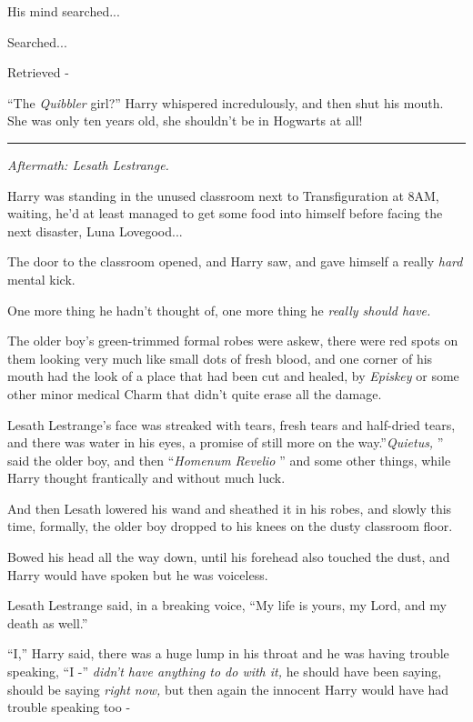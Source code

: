 His mind searched...

Searched...

Retrieved -

``The \emph{Quibbler} girl?'' Harry whispered incredulously, and then
shut his mouth. She was only ten years old, she shouldn't be in Hogwarts
at all!

\begin{center}\rule{3in}{0.4pt}\end{center}

\emph{Aftermath: Lesath Lestrange.}

Harry was standing in the unused classroom next to Transfiguration at
8AM, waiting, he'd at least managed to get some food into himself before
facing the next disaster, Luna Lovegood...

The door to the classroom opened, and Harry saw, and gave himself a
really \emph{hard} mental kick.

One more thing he hadn't thought of, one more thing he \emph{really
should have.}

The older boy's green-trimmed formal robes were askew, there were red
spots on them looking very much like small dots of fresh blood, and one
corner of his mouth had the look of a place that had been cut and
healed, by \emph{Episkey} or some other minor medical Charm that didn't
quite erase all the damage.

Lesath Lestrange's face was streaked with tears, fresh tears and
half-dried tears, and there was water in his eyes, a promise of still
more on the way.''\emph{Quietus,} '' said the older boy, and then
``\emph{Homenum Revelio} '' and some other things, while Harry thought
frantically and without much luck.

And then Lesath lowered his wand and sheathed it in his robes, and
slowly this time, formally, the older boy dropped to his knees on the
dusty classroom floor.

Bowed his head all the way down, until his forehead also touched the
dust, and Harry would have spoken but he was voiceless.

Lesath Lestrange said, in a breaking voice, ``My life is yours, my Lord,
and my death as well.''

``I,'' Harry said, there was a huge lump in his throat and he was having
trouble speaking, ``I -'' \emph{didn't have anything to do with it,} he
should have been saying, should be saying \emph{right now,} but then
again the innocent Harry would have had trouble speaking too -

